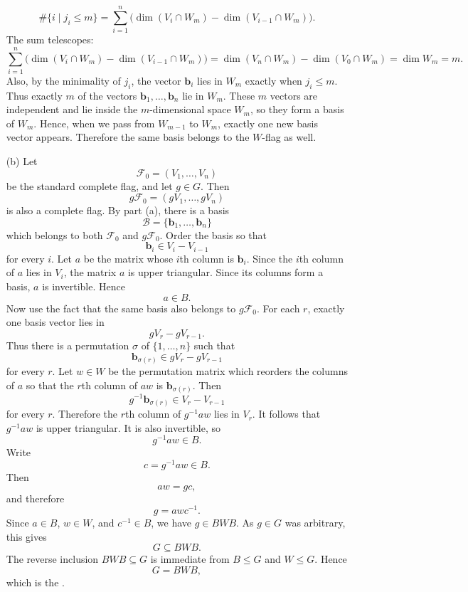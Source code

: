 \documentclass[../Odyssey_Project.tex]{subfiles}
\begin{document}
\begin{solution}
\begin{enumerate}
    \[
        \#\{i\mid j_i\leq m\}
        =
        \sum_{i=1}^n
        \bigl(\dim(V_i\cap W_m)-\dim(V_{i-1}\cap W_m)\bigr).
    \]
    The sum telescopes:
    \[
        \sum_{i=1}^n
        \bigl(\dim(V_i\cap W_m)-\dim(V_{i-1}\cap W_m)\bigr)
        =
        \dim(V_n\cap W_m)-\dim(V_0\cap W_m)
        =
        \dim W_m
        =
        m.
    \]
    Also, by the minimality of $j_i$, the vector $\mathbf{b}_i$ lies in $W_m$ exactly when $j_i\leq m$. Thus exactly $m$ of the vectors $\mathbf{b}_1,\dots,\mathbf{b}_n$ lie in $W_m$. These $m$ vectors are independent and lie inside the $m$-dimensional space $W_m$, so they form a basis of $W_m$. Hence, when we pass from $W_{m-1}$ to $W_m$, exactly one new basis vector appears. Therefore the same basis belongs to the $W$-flag as well.

        \item[(b)] Let
    \[
        \mathcal{F}_0=(V_1,\dots,V_n)
    \]
    be the standard complete flag, and let $g\in G$. Then
    \[
        g\mathcal{F}_0=(gV_1,\dots,gV_n)
    \]
    is also a complete flag. By part (a), there is a basis
    \[
        \mathcal{B}=\{\mathbf{b}_1,\dots,\mathbf{b}_n\}
    \]
    which belongs to both $\mathcal{F}_0$ and $g\mathcal{F}_0$. Order the basis so that
    \[
        \mathbf{b}_i\in V_i-V_{i-1}
    \]
    for every $i$. Let $a$ be the matrix whose $i$th column is $\mathbf{b}_i$. Since the $i$th column of $a$ lies in $V_i$, the matrix $a$ is upper triangular. Since its columns form a basis, $a$ is invertible. Hence
    \[
        a\in B.
    \]
    Now use the fact that the same basis also belongs to $g\mathcal{F}_0$. For each $r$, exactly one basis vector lies in
    \[
        gV_r-gV_{r-1}.
    \]
    Thus there is a permutation $\sigma$ of $\{1,\dots,n\}$ such that
    \[
        \mathbf{b}_{\sigma(r)}\in gV_r-gV_{r-1}
    \]
    for every $r$. Let $w\in W$ be the permutation matrix which reorders the columns of $a$ so that the $r$th column of $aw$ is $\mathbf{b}_{\sigma(r)}$. Then
    \[
        g^{-1}\mathbf{b}_{\sigma(r)}\in V_r-V_{r-1}
    \]
    for every $r$. Therefore the $r$th column of $g^{-1}aw$ lies in $V_r$. It follows that $g^{-1}aw$ is upper triangular. It is also invertible, so
    \[
        g^{-1}aw\in B.
    \]
    Write
    \[
        c=g^{-1}aw\in B.
    \]
    Then
    \[
        aw=gc,
    \]
    and therefore
    \[
        g=awc^{-1}.
    \]
    Since $a\in B$, $w\in W$, and $c^{-1}\in B$, we have $g\in BWB$. As $g\in G$ was arbitrary, this gives
    \[
        G\subseteq BWB.
    \]
    The reverse inclusion $BWB\subseteq G$ is immediate from $B\leq G$ and $W\leq G$. Hence
    \[
        G=BWB,
    \]
    which is the .
    \end{enumerate}
\end{solution}
\end{document}

